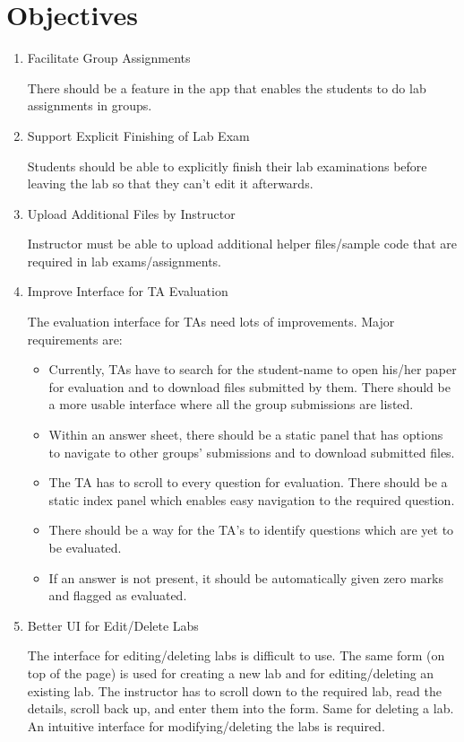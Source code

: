 \section{Objectives}
\begin{enumerate}
\item Facilitate Group Assignments

There should be a feature in the app that enables the students to do lab assignments in groups.

\item Support Explicit Finishing of Lab Exam

Students should be able to explicitly finish their lab examinations before leaving the lab so that they can't edit it afterwards.

\item Upload Additional Files by Instructor

Instructor must be able to upload additional helper files/sample code that are required in lab exams/assignments.

\item Improve Interface for TA Evaluation

The evaluation interface for TAs need lots of improvements. Major requirements are:
	\begin{itemize}
	\item Currently, TAs have to search for the student-name to open his/her paper for evaluation and to download files submitted by them. There should be a more usable interface where all the group submissions are listed.
	\item Within an answer sheet, there should be a static panel that has options to navigate to other groups' submissions and to download submitted files. %
	\item The TA has to scroll to every question for evaluation. There should be a static index panel which enables easy navigation to the required question.
	\item There should be a way for the TA's to identify questions which are yet to be evaluated.
	\item If an answer is not present, it should be automatically given zero marks and flagged as evaluated.
	\end{itemize}

\item Better UI for Edit/Delete Labs

The interface for editing/deleting labs is difficult to use. The same form (on top of the page) is used for creating a new lab and for editing/deleting an existing lab. The instructor has to scroll down to the required lab, read the details, scroll back up, and enter them into the form. Same for deleting a lab. An intuitive interface for modifying/deleting the labs is required.


\end{enumerate}
